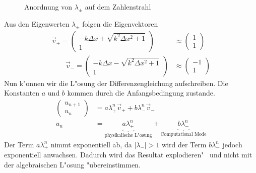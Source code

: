 \begin{refsection}
\begin{figure}
\begin{center}
		\caption{Anordnung von $\lambda_\pm$ auf dem Zahlenstrahl}
		\label{stosswellen:lamda}
	\end{center}
\end{figure}
Aus den Eigenwerten $\lambda_\pm$ folgen die Eigenvektoren 
\begin{align}
 	\vec v_+=\begin{pmatrix}-k\Delta x + \sqrt{k^2\Delta x^2 + 1}\\ 1\end{pmatrix} &\approx \begin{pmatrix} 1 \\ 1 \end{pmatrix} \\
 	\qquad
 	\vec v_-=\begin{pmatrix}-k\Delta x - \sqrt{k^2\Delta x^2 + 1}\\ 1\end{pmatrix} &\approx \begin{pmatrix} -1 \\ 1 \end{pmatrix} 
\end{align}
Nun k"onnen wir die L"osung der Differenzengleichung aufschreiben. Die Konstanten $a$ und $b$ kommen durch die Anfangsbedingung zustande.
\begin{align}
	\begin{pmatrix} u_{n+1} \\ u_n \end{pmatrix}  &= a \lambda_+^n \vec v_+ +  b \lambda_-^n \vec v_- \\
	u_n & =  \underbrace{a \lambda_+^n}_{\text{physikalische L"osung}} + \underbrace{ b \lambda_-^n}_{\text{Computational Mode}} 
	\label{stosswellen:cmexpo}
\end{align}
Der Term $a\lambda_+^n$ nimmt exponentiell ab, da $|\lambda_-|>1$ wird
der Term $b\lambda_-^n$ jedoch exponentiell anwachsen. Dadurch wird das
Resultat \grqq explodieren" \ und nicht mit der algebraischen L"osung
"ubereinstimmen.


\end{refsection}
